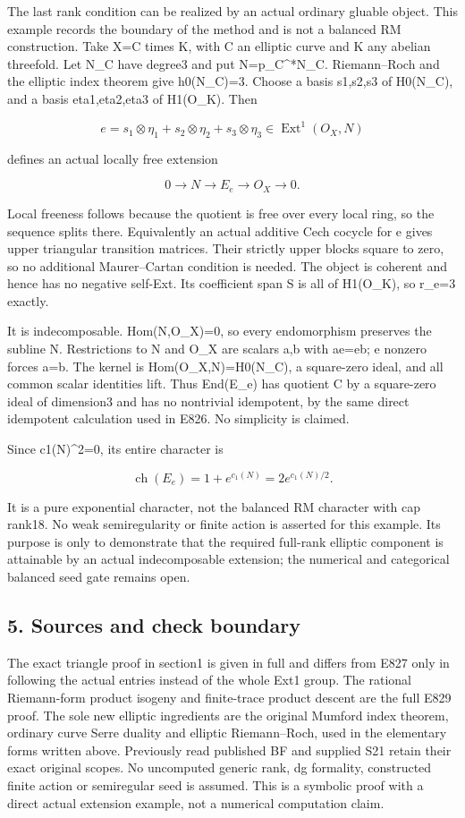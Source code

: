The last rank condition can be realized by an actual ordinary gluable
object. This example records the boundary of the method and is not a
balanced RM construction. Take X=C times K, with C an elliptic curve and K
any abelian threefold. Let N\_C have degree3 and put N=p\_C\^{}*N\_C.
Riemann--Roch and the elliptic index theorem give h0(N\_C)=3. Choose a basis
s1,s2,s3 of H0(N\_C), and a basis eta1,eta2,eta3 of H1(O\_K). Then

\[
 e=s_1\otimes\eta_1+s_2\otimes\eta_2+s_3\otimes\eta_3
       \in\operatorname{Ext}^1(O_X,N)
 \tag{E830.11}
\]

defines an actual locally free extension

\[
 0\longrightarrow N\longrightarrow E_e\longrightarrow O_X
 \longrightarrow0.
 \tag{E830.12}
\]

Local freeness follows because the quotient is free over every local ring,
so the sequence splits there. Equivalently an actual additive Cech cocycle
for e gives upper triangular transition matrices. Their strictly upper
blocks square to zero, so no additional Maurer--Cartan condition is needed.
The object is coherent and hence has no negative self-Ext. Its coefficient
span S is all of H1(O\_K), so r\_e=3 exactly.

It is indecomposable. Hom(N,O\_X)=0, so every endomorphism preserves the
subline N. Restrictions to N and O\_X are scalars a,b with ae=eb; e nonzero
forces a=b. The kernel is Hom(O\_X,N)=H0(N\_C), a square-zero ideal, and all
common scalar identities lift. Thus End(E\_e) has quotient C by a
square-zero ideal of dimension3 and has no nontrivial idempotent, by the
same direct idempotent calculation used in E826. No simplicity is claimed.

Since c1(N)\^{}2=0, its entire character is

\[
 \operatorname{ch}(E_e)=1+e^{c_1(N)}
       =2e^{c_1(N)/2}.
 \tag{E830.13}
\]

It is a pure exponential character, not the balanced RM character with cap
rank18. No weak semiregularity or finite action is asserted for this
example. Its purpose is only to demonstrate that the required full-rank
elliptic component is attainable by an actual indecomposable extension; the
numerical and categorical balanced seed gate remains open.

\subsection{5. Sources and check boundary}\label{SF-E830:sources-and-check-boundary}

The exact triangle proof in section1 is given in full and differs from E827
only in following the actual entries instead of the whole Ext1 group. The
rational Riemann-form product isogeny and finite-trace product descent are
the full E829 proof. The sole new elliptic ingredients are the original
Mumford index theorem, ordinary curve Serre duality and elliptic
Riemann--Roch, used in the elementary forms written above. Previously read
published BF and supplied S21 retain their exact original scopes. No
uncomputed generic rank, dg formality, constructed finite action or
semiregular seed is assumed. This is a symbolic proof with a direct actual
extension example, not a numerical computation claim.
